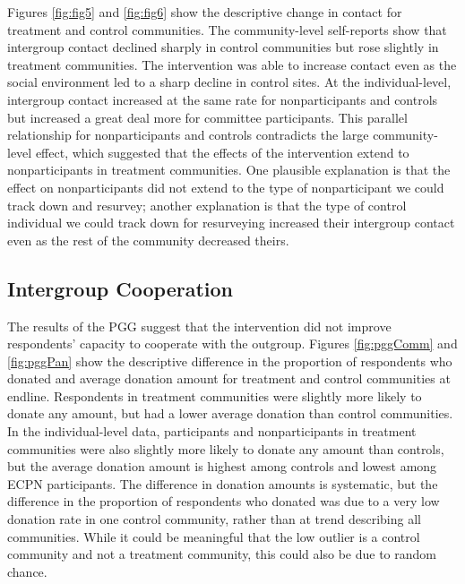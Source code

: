 \documentclass[11pt]{article}
\begin{document}
Figures \ref{fig:fig5} and \ref{fig:fig6} show the descriptive change in
contact for treatment and control communities. The community-level
self-reports show that intergroup contact declined sharply in control
communities but rose slightly in treatment communities. The intervention
was able to increase contact even as the social environment led to a
sharp decline in control sites. At the individual-level, intergroup
contact increased at the same rate for nonparticipants and controls but
increased a great deal more for committee participants. This parallel
relationship for nonparticipants and controls contradicts the large
community-level effect, which suggested that the effects of the
intervention extend to nonparticipants in treatment communities. One
plausible explanation is that the effect on nonparticipants did not
extend to the type of nonparticipant we could track down and resurvey;
another explanation is that the type of control individual we could
track down for resurveying increased their intergroup contact even as
the rest of the community decreased theirs.

\hypertarget{intergroup-cooperation}{%
\subsection{Intergroup Cooperation}\label{intergroup-cooperation}}

The results of the PGG suggest that the intervention did not improve
respondents' capacity to cooperate with the outgroup. Figures
\ref{fig:pggComm} and \ref{fig:pggPan} show the descriptive difference
in the proportion of respondents who donated and average donation amount
for treatment and control communities at endline. Respondents in
treatment communities were slightly more likely to donate any amount,
but had a lower average donation than control communities. In the
individual-level data, participants and nonparticipants in treatment
communities were also slightly more likely to donate any amount than
controls, but the average donation amount is highest among controls and
lowest among ECPN participants. The difference in donation amounts is
systematic, but the difference in the proportion of respondents who
donated was due to a very low donation rate in one control community,
rather than at trend describing all communities. While it could be
meaningful that the low outlier is a control community and not a
treatment community, this could also be due to random chance.
\end{document}
